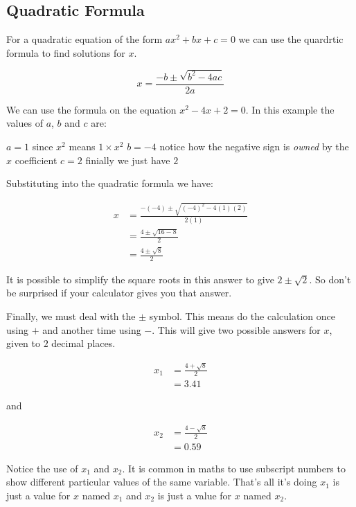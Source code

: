 \documentclass[
  a4paper,
]{scrbook}
\begin{document}
\hypertarget{quadratic-formula}{%
\subsection{Quadratic Formula}\label{quadratic-formula}}

For a quadratic equation of the form \(ax^2 + bx + c = 0\) we can use
the quardrtic formula to find solutions for \(x\).

\[
x = \frac{-b \pm \sqrt{b^2-4ac}}{2a}
\]

We can use the formula on the equation \(x^2 -4x +2 = 0\). In this
example the values of \(a\), \(b\) and \(c\) are:

\(a=1\) since \(x^2\) means \(1 \times x^2\) \(b=-4\) notice how the
negative sign is \emph{owned} by the \(x\) coefficient \(c=2\) finially
we just have \(2\)

Substituting into the quadratic formula we have:

\[
\begin{aligned} x &= \frac{-(-4) \pm \sqrt{(-4)^2-4(1)(2)}}{2(1)} \\
&= \frac{4 \pm \sqrt{16-8}}{2} \\
&= \frac{4 \pm \sqrt{8}}{2}
\end{aligned}
\]

It is possible to simplify the square roots in this answer to give
\(2 \pm \sqrt{2}\). So don't be surprised if your calculator gives you
that answer.

Finally, we must deal with the \(\pm\) symbol. This means do the
calculation once using \(+\) and another time using \(-\). This will
give two possible answers for \(x\), given to \(2\) decimal places.

\[
\begin{aligned} x_1 &= \frac{4 + \sqrt{8}}{2} \\
&= 3.41
\end{aligned}
\]

and

\[
\begin{aligned} x_2 &= \frac{4 - \sqrt{8}}{2} \\
&= 0.59
\end{aligned}
\]

\begin{tcolorbox}[enhanced jigsaw, opacityback=0, left=2mm, toptitle=1mm, title=\textcolor{quarto-callout-tip-color}{\faLightbulb}\hspace{0.5em}{Pro tip}, breakable, colbacktitle=quarto-callout-tip-color!10!white, opacitybacktitle=0.6, bottomtitle=1mm, arc=.35mm, colback=white, leftrule=.75mm, bottomrule=.15mm, colframe=quarto-callout-tip-color-frame, rightrule=.15mm, titlerule=0mm, toprule=.15mm, coltitle=black]
Notice the use of \(x_1\) and \(x_2\). It is common in maths to use
subscript numbers to show different particular values of the same
variable. That's all it's doing \(x_1\) is just a value for \(x\) named
\(x_1\) and \(x_2\) is just a value for \(x\) named \(x_2\).
\end{tcolorbox}
\end{document}
